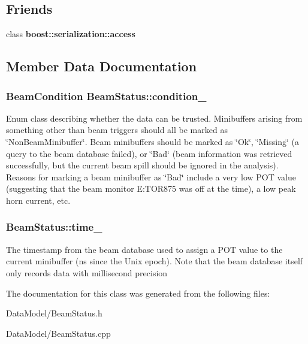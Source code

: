 \subsection*{Friends}
\begin{DoxyCompactItemize}
\item 
\hypertarget{classBeamStatus_ac98d07dd8f7b70e16ccb9a01abf56b9c}{
class {\bfseries boost::serialization::access}}
\label{classBeamStatus_ac98d07dd8f7b70e16ccb9a01abf56b9c}

\end{DoxyCompactItemize}


\subsection{Member Data Documentation}
\hypertarget{classBeamStatus_a8e81a7fca77f64c2ce0e41bd0e14c3ea}{
\subsubsection[{condition\_\-}]{\setlength{\rightskip}{0pt plus 5cm}BeamCondition {\bf BeamStatus::condition\_\-}}}
\label{classBeamStatus_a8e81a7fca77f64c2ce0e41bd0e14c3ea}


Enum class describing whether the data can be trusted. Minibuffers arising from something other than beam triggers should all be marked as \char`\"{}NonBeamMinibuffer\char`\"{}. Beam minibuffers should be marked as \char`\"{}Ok\char`\"{}, \char`\"{}Missing\char`\"{} (a query to the beam database failed), or \char`\"{}Bad\char`\"{} (beam information was retrieved successfully, but the current beam spill should be ignored in the analysis). Reasons for marking a beam minibuffer as \char`\"{}Bad\char`\"{} include a very low POT value (suggesting that the beam monitor E:TOR875 was off at the time), a low peak horn current, etc. \hypertarget{classBeamStatus_a499b220ec0c80ce883d19f8f9520934d}{
\subsubsection[{time\_\-}]{ {\bf BeamStatus::time\_\-}}}
\label{classBeamStatus_a499b220ec0c80ce883d19f8f9520934d}


The timestamp from the beam database used to assign a POT value to the current minibuffer (ns since the Unix epoch). Note that the beam database itself only records data with millisecond precision 

The documentation for this class was generated from the following files:\begin{DoxyCompactItemize}
\item 
DataModel/BeamStatus.h\item 
DataModel/BeamStatus.cpp\end{DoxyCompactItemize}
